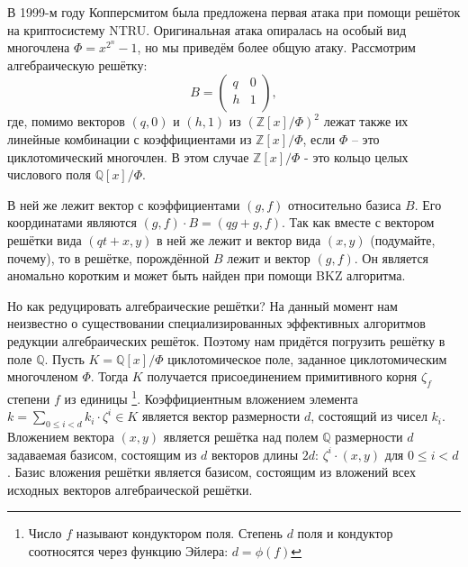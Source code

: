 \documentclass[11pt]{exam}
\newcommand{\Z}{\mathbb{Z}}
\newcommand{\Q}{\mathbb{Q}}
\begin{document}
{	 В 1999-м году Копперсмитом \cite{coppersmith1997lattice} была предложена первая атака при помощи решёток на криптосистему NTRU. Оригинальная атака опиралась на особый вид многочлена $\Phi = x^{2^n} - 1$, но мы приведём более общую атаку. Рассмотрим  алгебраическую решётку:
	 \begin{equation}
	 	B = \begin{pmatrix}
	 		q & 0 \\
	 		h & 1 \\
	 	\end{pmatrix},
	 \end{equation}
 	где, помимо векторов $(q,0)$ и $(h,1)$ из $(\Z[x] / \Phi)^2$ лежат также их линейные комбинации с коэффициентами из $\Z[x] / \Phi$, если $\Phi$ -- это циклотомический многочлен. В этом случае $\Z[x] / \Phi$ - это кольцо целых числового поля $\Q[x] / \Phi$.
 	
 	В ней же лежит вектор с коэффициентами $(g,f)$ относительно базиса $B$. Его координатами являются $(g,f) \cdot B = (qg + g, f)$. Так как вместе с вектором решётки вида $(qt+x,y)$ в ней же лежит и вектор вида $(x,y)$ (подумайте, почему), то в решётке, порождённой $B$ лежит и вектор $(g,f)$. Он является аномально коротким и может быть найден при помощи BKZ алгоритма.
 	
 	Но как редуцировать алгебраические решётки? На данный момент нам неизвестно о существовании специализированных эффективных алгоритмов редукции алгебраических решёток. Поэтому нам придётся погрузить решётку в поле $\Q$.
 	Пусть $K = \Q[x] / \Phi$ циклотомическое поле, заданное циклотомическим многочленом $\Phi$. Тогда $K$ получается присоединением примитивного корня $\zeta_f$ степени $f$ из единицы \footnote{Число $f$ называют кондуктором поля. Степень $d$ поля и кондуктор соотносятся через функцию Эйлера: $d = \phi(f)$}. Коэффициентным вложением элемента $k=\sum_{0\leqslant i <d} k_i \cdot \zeta^i \in K$ является вектор размерности $d$, состоящий из чисел $k_i$. Вложением вектора $(x,y)$ является решётка над полем $\Q$ размерности $d$ задаваемая базисом, состоящим из $d$ векторов длины $2d$: $\zeta^i \cdot (x,y)$ для $0 \leqslant i < d$. Базис вложения решётки является базисом, состоящим из вложений всех исходных векторов алгебраической решётки.
 	
}
\end{document}

